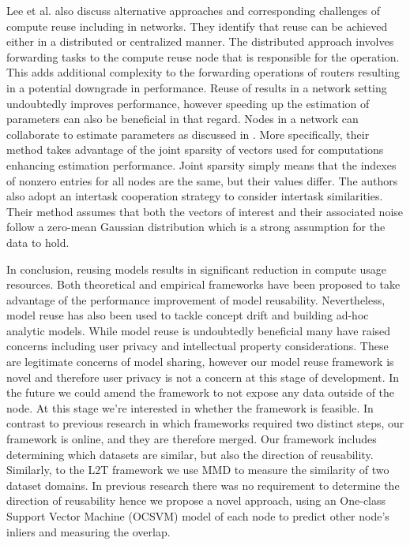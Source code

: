 \documentclass{mprop}
\begin{document}
Lee et al. \cite{ComputeReuse} also discuss alternative approaches and corresponding challenges of compute reuse including in networks. They identify that reuse can be achieved either in a distributed or centralized manner. The distributed approach involves forwarding tasks to the compute reuse node that is responsible for the operation. This adds additional complexity to the forwarding operations of routers resulting in a potential downgrade in performance. Reuse of results in a network setting undoubtedly improves performance, however speeding up the estimation of parameters can also be beneficial in that regard. Nodes in a network can collaborate to estimate parameters as discussed in \cite{DistributedEstimation}. More specifically, their method takes advantage of the joint sparsity of vectors used for computations enhancing estimation performance. Joint sparsity simply means that the indexes of nonzero entries for all nodes are the same, but their values differ.  The authors also adopt an intertask cooperation strategy to consider intertask similarities. Their method assumes that both the vectors of interest and their associated noise follow a zero-mean Gaussian distribution which is a strong assumption for the data to hold.

In conclusion, reusing models results in significant reduction in compute usage resources. Both theoretical and empirical frameworks have been proposed to take advantage of the performance improvement of model reusability. Nevertheless, model reuse has also been used to tackle concept drift and building ad-hoc analytic models. While model reuse is undoubtedly beneficial many have raised concerns including user privacy and intellectual property considerations. These are legitimate concerns of model sharing, however  our model reuse  framework is novel and therefore user privacy is not a concern at this stage of development. In the future we could amend the framework to not expose any data outside of the node. At this stage we're interested in whether the framework is feasible. In contrast to previous research in which frameworks required two distinct steps, our framework is online, and they are therefore merged. Our framework includes determining which datasets are similar, but also the direction of reusability.  Similarly, to the L2T \cite{L2T} framework we use MMD to measure the similarity of two dataset domains. In previous research there was no requirement to determine the direction of reusability hence we propose a novel approach, using an One-class Support Vector Machine (OCSVM)  model of each node to predict other node’s inliers and measuring the overlap.
\end{document}
